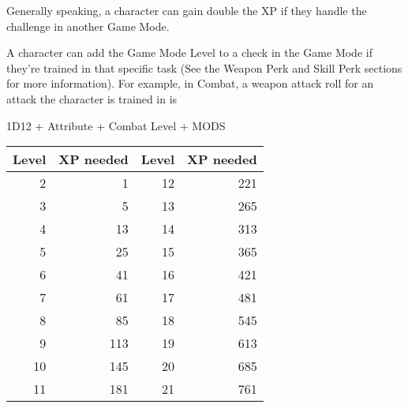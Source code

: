 Generally speaking, a character can gain double the XP if they handle the challenge in another Game Mode.

A character can add the Game Mode Level to a check in the Game Mode if they're trained in that specific task (See the Weapon Perk and Skill Perk sections for more information). For example, in Combat, a weapon attack roll for an attack the character is trained in is \\
\begin{center}
	
1D12 + Attribute + Combat Level + MODS\\


\begin{tabular}{r r | r r}
Level & XP needed & Level & XP needed\\ \hline
2 & 1 & 12 & 221\\
3 & 5 & 13 & 265\\
4 & 13 & 14 & 313\\
5 & 25 & 15 & 365\\
6 & 41 & 16 & 421\\
7 & 61 & 17 & 481\\
8 & 85 & 18 & 545\\
9 & 113 & 19 & 613\\
10 & 145 & 20 & 685\\
11 & 181 & 21 & 761\\
\end{tabular}\\~\\





\end{center}